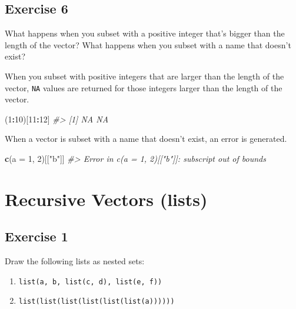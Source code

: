 \documentclass[]{book}
\newenvironment{Shaded}{\begin{snugshade}}{\end{snugshade}}
\newcommand{\CommentTok}[1]{\textcolor[rgb]{0.56,0.35,0.01}{\textit{#1}}}
\newcommand{\DataTypeTok}[1]{\textcolor[rgb]{0.13,0.29,0.53}{#1}}
\newcommand{\DecValTok}[1]{\textcolor[rgb]{0.00,0.00,0.81}{#1}}
\newcommand{\KeywordTok}[1]{\textcolor[rgb]{0.13,0.29,0.53}{\textbf{#1}}}
\newcommand{\NormalTok}[1]{#1}
\newcommand{\OperatorTok}[1]{\textcolor[rgb]{0.81,0.36,0.00}{\textbf{#1}}}
\newcommand{\StringTok}[1]{\textcolor[rgb]{0.31,0.60,0.02}{#1}}
\providecommand{\tightlist}{%
  \setlength{\itemsep}{0pt}\setlength{\parskip}{0pt}}
\theoremstyle{plain}
\theoremstyle{remark}
\theoremstyle{definition}
\theoremstyle{definition}
\theoremstyle{definition}
\theoremstyle{remark}
\begin{document}
\hypertarget{exercise-6-13}{%
\subsection{Exercise 6}\label{exercise-6-13}}

What happens when you subset with a positive integer that's bigger than
the length of the vector? What happens when you subset with a name that
doesn't exist?

When you subset with positive integers that are larger than the length
of the vector, \texttt{NA} values are returned for those integers larger
than the length of the vector.

\begin{Shaded}
\begin{Highlighting}[]
\NormalTok{(}\DecValTok{1}\OperatorTok{:}\DecValTok{10}\NormalTok{)[}\DecValTok{11}\OperatorTok{:}\DecValTok{12}\NormalTok{]}
\CommentTok{#> [1] NA NA}
\end{Highlighting}
\end{Shaded}

When a vector is subset with a name that doesn't exist, an error is
generated.

\begin{Shaded}
\begin{Highlighting}[]
\KeywordTok{c}\NormalTok{(}\DataTypeTok{a =} \DecValTok{1}\NormalTok{, }\DecValTok{2}\NormalTok{)[[}\StringTok{"b"}\NormalTok{]]}
\CommentTok{#> Error in c(a = 1, 2)[["b"]]: subscript out of bounds}
\end{Highlighting}
\end{Shaded}

\hypertarget{recursive-vectors-lists}{%
\section{Recursive Vectors (lists)}\label{recursive-vectors-lists}}

\hypertarget{exercise-1-55}{%
\subsection{Exercise 1}\label{exercise-1-55}}

Draw the following lists as nested sets:

\begin{enumerate}
\def\labelenumi{\arabic{enumi}.}
\tightlist
\item
  \texttt{list(a,\ b,\ list(c,\ d),\ list(e,\ f))}
\item
  \texttt{list(list(list(list(list(list(a))))))}
\end{enumerate}
\end{document}
